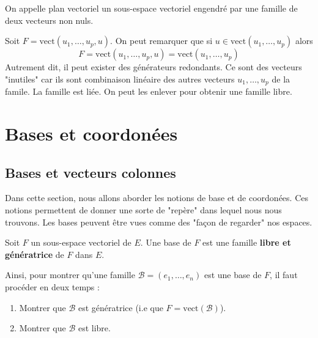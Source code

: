 \begin{definition}
    On appelle plan vectoriel un sous-espace vectoriel engendré par une famille de deux vecteurs non nuls. 
\end{definition}

\begin{remark}
    Soit $ F = \text{vect}(u_1, \dots, u_p, u)$. On peut remarquer que si $ u \in \text{vect}(u_1, \dots, u_p)$ alors 
        \[ F = \text{vect}(u_1, \dots, u_p, u) = \text{vect}(u_1, \dots, u_p) \] 
    Autrement dit, il peut exister des générateurs redondants. Ce sont des vecteurs "inutiles" car ils sont 
    combinaison linéaire des autres vecteurs $ u_1, \dots, u_p$ de la famile. La famille est liée. On peut les enlever 
    pour obtenir une famille libre. 
\end{remark}


\section{Bases et coordonées}

\subsection{Bases et vecteurs colonnes}

Dans cette section, nous allons aborder les notions de base et de coordonées. Ces notions permettent de donner 
une sorte de "repère" dans lequel nous nous trouvons. Les bases peuvent être vues comme des "façon de regarder" nos espaces. 

\begin{definition}[Base]
    Soit $F$ un sous-espace vectoriel de $E$. Une base de $F$ est une famille \textbf{libre et génératrice} 
    de $F$ dans $E$. 
\end{definition}

\begin{remark}
    Ainsi, pour montrer qu'une famille $ \mathcal{B} = (e_1, \dots, e_n)$ est une base de $F$, il faut procéder en deux temps : 
    \begin{enumerate}[label=\roman*)]
        \item Montrer que $ \mathcal{B}$ est génératrice (i.e que $F = \text{vect}( \mathcal{B})$). 
        \item Montrer que $ \mathcal{B} $ est libre. 
    \end{enumerate}
\end{remark}

